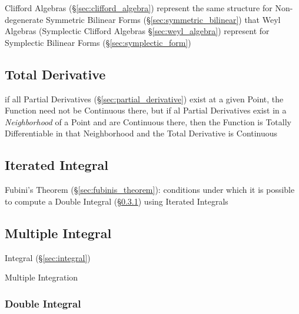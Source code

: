 \asterism

Clifford Algebras (\S\ref{sec:clifford_algebra}) represent the same structure
for Non-degenerate Symmetric Bilinear Forms (\S\ref{sec:symmetric_bilinear})
that Weyl Algebras (Symplectic Clifford Algebras \S\ref{sec:weyl_algebra})
represent for Symplectic Bilinear Forms (\S\ref{sec:symplectic_form})



\subsection{Total Derivative}\label{sec:total_derivative}

if all Partial Derivatives (\S\ref{sec:partial_derivative}) exist at a given
Point, the Function need not be Continuous there, but if al Partial Derivatives
exist in a \emph{Neighborhood} of a Point and are Continuous there, then the
Function is Totally Differentiable in that Neighborhood and the Total Derivative
is Continuous



\subsection{Iterated Integral}\label{sec:iterated_integral}

\fist Fubini's Theorem (\S\ref{sec:fubinis_theorem}): conditions under which it
is possible to compute a Double Integral (\S\ref{sec:double_integral}) using
Iterated Integrals



\subsection{Multiple Integral}\label{sec:multiple_integral}

Integral (\S\ref{sec:integral})

Multiple Integration



\subsubsection{Double Integral}\label{sec:double_integral}

